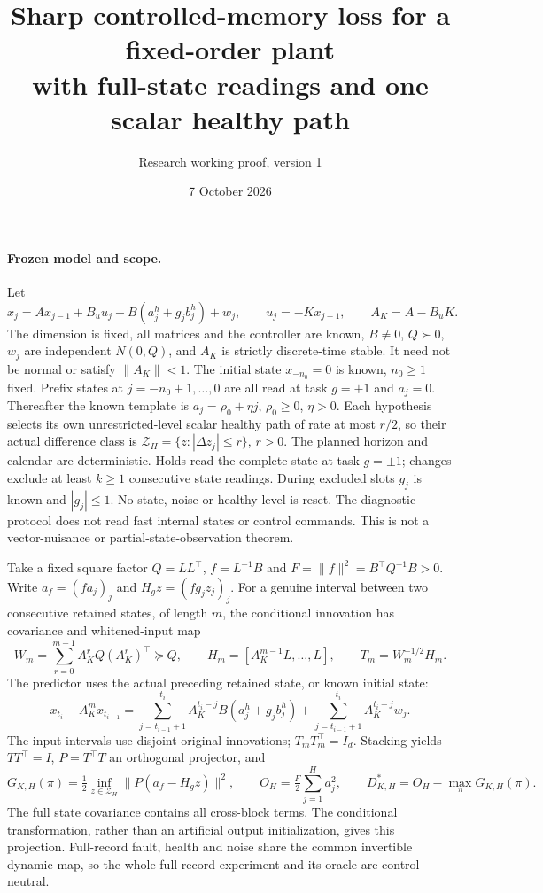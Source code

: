 \documentclass[11pt]{article}
\title{Sharp controlled-memory loss for a fixed-order plant\\with full-state readings and one scalar healthy path}
\author{Research working proof, version 1}
\date{7 October 2026}
\begin{document}
\maketitle

\paragraph{Frozen model and scope.}
Let
\[
x_j=A x_{j-1}+B_u u_j+B(a_j^h+g_j b_j^h)+w_j,\qquad
u_j=-Kx_{j-1},\qquad A_K=A-B_uK .
\]
The dimension is fixed, all matrices and the controller are known,
$B\ne0$, $Q\succ0$, $w_j$ are independent $N(0,Q)$, and $A_K$ is strictly
discrete-time stable. It need not be normal or satisfy $\|A_K\|<1$.
The initial state $x_{-n_0}=0$ is known, $n_0\ge1$ fixed.
Prefix states at $j=-n_0+1,\ldots,0$ are all read at task $g=+1$ and
$a_j=0$. Thereafter the known template is $a_j=\rho_0+\eta j$,
$\rho_0\ge0$, $\eta>0$. Each hypothesis selects its own unrestricted-level
scalar healthy path of rate at most $r/2$, so their actual difference class
is $\mathcal Z_H=\{z:|\Delta z_j|\le r\}$, $r>0$.
The planned horizon and calendar are deterministic. Holds read the complete
state at task $g=\pm1$; changes exclude at least $k\ge1$ consecutive state
readings. During excluded slots $g_j$ is known and $|g_j|\le1$.
No state, noise or healthy level is reset.
The diagnostic protocol does not read fast internal states or control commands.
This is not a vector-nuisance or partial-state-observation theorem.

Take a fixed square factor $Q=LL^\top$, $f=L^{-1}B$ and
$F=\|f\|^2=B^\top Q^{-1}B>0$.
Write $a_f=(f a_j)_j$ and $H_gz=(f g_j z_j)_j$.
For a genuine interval between two consecutive retained states, of length $m$,
the conditional innovation has covariance and whitened-input map
\[
W_m=\sum_{r=0}^{m-1}A_K^rQ(A_K^r)^\top\succeq Q,\qquad
H_m=[A_K^{m-1}L,\ldots,L],\qquad T_m=W_m^{-1/2}H_m .
\]
The predictor uses the actual preceding retained state, or known initial state:
\[
x_{t_i}-A_K^m x_{t_{i-1}}
=\sum_{j=t_{i-1}+1}^{t_i}A_K^{t_i-j}B(a_j^h+g_jb_j^h)
+\sum_{j=t_{i-1}+1}^{t_i}A_K^{t_i-j}w_j .
\]
The input intervals use disjoint original innovations; $T_mT_m^\top=I_d$.
Stacking yields $TT^\top=I$, $P=T^\top T$ an orthogonal projector, and
\[
G_{K,H}(\pi)=\tfrac12\inf_{z\in\mathcal Z_H}\|P(a_f-H_gz)\|^2,\qquad
O_H=\tfrac F2\sum_{j=1}^H a_j^2,\qquad
D_{K,H}^*=O_H-\max_\pi G_{K,H}(\pi).
\]
The full state covariance contains all cross-block terms. The conditional
transformation, rather than an artificial output initialization, gives this
projection. Full-record fault, health and noise share the common invertible
dynamic map, so the whole full-record experiment and its oracle are
control-neutral.
\end{document}
